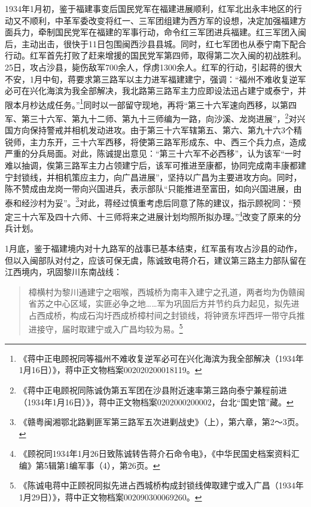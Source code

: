 1934年1月初，鉴于福建事变后国民党军在福建进展顺利，红军北出永丰地区的行动又不顺利，中革军委改变将红一、三军团组建为西方军的设想，决定加强福建方面兵力，牵制国民党军在福建的军事行动，命令红三军团进兵福建。红三军团入闽后，主动出击，很快于11日包围闽西沙县县城。同时，红七军团也从泰宁南下配合行动。红军首先打败了赶来增援的国民党军第四师，取得第二次入闽的初战胜利。25日，攻占沙县，毙伤敌军700余人，俘虏1300余人。红军的行动，引起蒋的很大不安，1月中旬，蒋要求第三路军以主力进军福建建宁，强调：“福州不难收复逆军必可在兴化海滨为我全部解决，我北路第三路军主力应即设法迅占建宁或泰宁，并限本月杪达成任务。”\footnote{《蒋中正电顾祝同等福州不难收复逆军必可在兴化海滨为我全部解决（1934年1月16日）》，蒋中正文物档案002020200018119。}同时以一部留守现地，再将“第三十六军速向西移，以第四军、第三十六军、第九十二师、第九十三师编为一路，向沙溪、龙岗进展”，\footnote{《蒋中正电顾祝同陈诚伪第五军团在沙县附近速率第三路向泰宁兼程前进（1934年1月16日）》，蒋中正文物档案0202000200002，台北“国史馆”藏。}对兴国方向保持警戒并相机发动进攻。由于第三十六军辖第五、第六、第九十六3个精锐师，主力东开，三十六军西移，将使第三路军形成东、中、西三个兵力点，造成严重的分兵局面。对此，陈诚提出意见：“第三十六军不必西移”，认为该军“一时难以抽调，俟第三路军主力占领建宁后，该军可推进至康都，协同完成南丰康都建宁封锁线，并相机策应主力，向广昌进展”，坚持以广昌为主要进攻方向。同时，陈不赞成由龙岗一带向兴国进兵，表示部队“只能推进至富田，如向兴国进展，由泰和经沙村为妥”。\footnote{《赣粤闽湘鄂北路剿匪军第三路军五次进剿战史》（上），第六章，第2～3页。}对此，蒋经过慎重考虑后同意了陈的建议，指示顾祝同：“预定三十六军及四十六师、十三师将来之进展计划均照所拟办理。”\footnote{《顾祝同1934年1月26日致陈诚转告蒋介石命令电》，《中华民国史档案资料汇编》第5辑第1编军事（4），第26页。}改变了原来的分兵计划。


1月底，鉴于福建境内对十九路军的战事已基本结束，红军虽有攻占沙县的动作，但以入闽部队对付之，应该可保无虞，陈诚致电蒋介石，建议第三路主力部队留在江西境内，巩固黎川东南战线：

\begin{quote}

樟横村为黎川通建宁之咽喉，西城桥为南丰入建宁之孔道，两者均为伪赣闽省苏之中心区域，实匪必争之地……军为巩固后方并节约兵力起见，拟先进占西成桥，构成石沟圩西成桥樟村间之封锁线，将钟贤东坪西坪一带守兵推进接守，届时取建宁或入广昌均较为易。\footnote{《陈诚电蒋中正顾祝同拟先进占西城桥构成封锁线俾取建宁或入广昌（1934年1月29日）》，蒋中正文物档案002090300069260。}
\end{quote}


